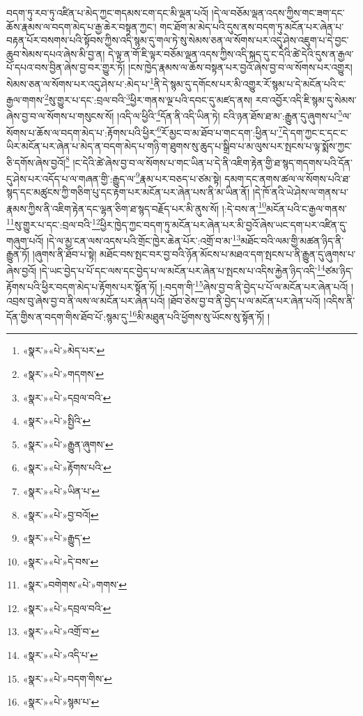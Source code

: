 བདག་ཏུ་རབ་ཏུ་འཛིན་པ་མེད་ཀྱང་གདམས་ངག་དང་མི་ལྡན་པའོ། །དེ་ལ་བཅོམ་ལྡན་འདས་ཀྱིས་གང་ཟག་དང་ཆོས་རྣམས་ལ་བདག་མེད་པ་རྒྱ་ཆེར་བསྟན་ཀྱང་། གང་ཐོག་མ་མེད་པའི་དུས་ནས་བདག་ཏུ་མངོན་པར་ཞེན་པ་བརྟན་པོར་བསགས་པའི་སྟོབས་ཀྱིས་འདི་སྙམ་དུ་གལ་ཏེ་སུ་སེམས་ཅན་ལ་སོགས་པར་འདུ་ཤེས་འཇུག་པ་དེ་བྱང་ཆུབ་སེམས་དཔའ་ཞེས་མི་བྱ་ན། དེ་ལྟ་ན་གོ་ཇི་ལྟར་བཅོམ་ལྡན་འདས་ཀྱིས་འདི་སྐད་དུ་ང་དེའི་ཚེ་དེའི་དུས་ན་རྒྱལ་པོ་དཔའ་བས་བྱིན་ཞེས་བྱ་བར་གྱུར་ཏོ། །ངས་ཁྱེད་རྣམས་ལ་ཆོས་བསྟན་པར་བྱའོ་ཞེས་བྱ་བ་ལ་སོགས་པར་འགྱུར། སེམས་ཅན་ལ་སོགས་པར་འདུ་ཤེས་པ་:མེད་པ་\footnote{«སྣར་»«པེ་»མེད་པར་}ནི་དེ་སྙམ་དུ་དགོངས་པར་མི་འགྱུར་རོ་སྙམ་པ་དེ་མངོན་པའི་ང་རྒྱལ་གགས་\footnote{«སྣར་»«པེ་»གདགས་}སུ་གྱུར་པ་དང་:བྲལ་བའི་\footnote{«སྣར་»«པེ་»དབྲལ་བའི་}ཕྱིར་གནས་ལྔ་པའི་དབང་དུ་མཛད་ནས། རབ་འབྱོར་འདི་ཇི་སྙམ་དུ་སེམས་ཞེས་བྱ་བ་ལ་སོགས་པ་གསུངས་སོ། །འདི་ལ་ཕྱིའི་\footnote{«སྣར་»«པེ་»སྤྱིའི་}དོན་ནི་འདི་ཡིན་ཏེ། ངའི་ཉན་ཐོས་ཐ་མ་:རྒྱུན་དུ་ཞུགས་པ་\footnote{«སྣར་»«པེ་»རྒྱུན་ཞུགས་}ལ་སོགས་པ་ཆོས་ལ་བདག་མེད་པ་:རྟོགས་པའི་ཕྱིར་\footnote{«སྣར་»«པེ་»རྟོགས་པའི་}རོ་མྱང་བ་མ་ཐོབ་པ་གང་དག་:ཕྱིན་པ་\footnote{«སྣར་»«པེ་»ཡིན་པ་}དེ་དག་ཀྱང་ང་དང་ང་ཡིར་མངོན་པར་ཞེན་པ་མེད་ན་བདག་མེད་པ་གཉི་ག་ཐུགས་སུ་ཆུད་པ་སྒྲིབ་པ་མ་ལུས་པར་སྤངས་པ་ལྟ་སྨོས་ཀྱང་ཅི་དགོས་ཞེས་བྱའོ།\footnote{«སྣར་»«པེ་»བྱ་བའོ།} །ང་དེའི་ཚེ་ཞེས་བྱ་བ་ལ་སོགས་པ་གང་ཡིན་པ་དེ་ནི་འཇིག་རྟེན་གྱི་ཐ་སྙད་གདགས་པའི་དོན་དུ་ཤེས་པར་འདོད་པ་ལ་གཞན་གྱི་:རྒྱུད་ལ་\footnote{«སྣར་»«པེ་»རྒྱུད་}རྣམ་པར་བཅད་པ་ཙམ་སྟེ། དམག་དང་ནགས་ཚལ་ལ་སོགས་པའི་ཐ་སྙད་དང་མཚུངས་ཀྱི་གཅིག་པུ་དང་རྟག་པར་མངོན་པར་ཞེན་པས་ནི་མ་ཡིན་ནོ། །དེ་ཁོ་ནའི་ཡེ་ཤེས་ལ་གནས་པ་རྣམས་ཀྱིས་ནི་འཇིག་རྟེན་དང་ལྷན་ཅིག་ཐ་སྙད་བརྗོད་པར་མི་ནུས་སོ། །:དེ་བས་ན་\footnote{«སྣར་»«པེ་»དེ་བས་}མངོན་པའི་ང་རྒྱལ་གནས་\footnote{«སྣར་»བགེགས་«པེ་»གགས་}སུ་གྱུར་པ་དང་:བྲལ་བའི་\footnote{«སྣར་»«པེ་»དབྲལ་བའི་}ཕྱིར་ཁྱེད་ཀྱང་བདག་ཏུ་མངོན་པར་ཞེན་པར་མི་བྱའོ་ཞེས་ཡང་དག་པར་འཛིན་དུ་གཞུག་པའོ། །དེ་ལ་མྱ་ངན་ལས་འདས་པའི་གྲོང་ཁྱེར་ཆེན་པོར་:འགྲོ་བ་མ་\footnote{«སྣར་»«པེ་»འགྲོ་བ་}མཐོང་བའི་ལམ་གྱི་མཚན་ཉིད་ནི་རྒྱུན་ཏོ། །ཞུགས་ནི་ཐོབ་པ་སྟེ། མཐོང་བས་སྤང་བར་བྱ་བའི་ཉོན་མོངས་པ་མཐའ་དག་སྤངས་པ་ནི་རྒྱུན་དུ་ཞུགས་པ་ཞེས་བྱའོ། །དེ་ཡང་བྱེད་པ་པོ་དང་ལས་དང་བྱེད་པ་ལ་མངོན་པར་ཞེན་པ་སྤངས་པ་འདིས་རྐྱེན་ཉིད་འདི་\footnote{«སྣར་»«པེ་»འདི་པ་}ཙམ་ཉིད་རྟོགས་པའི་ཕྱིར་བདག་མེད་པ་རྟོགས་པར་སྟོན་ཏོ། །:བདག་གི་\footnote{«སྣར་»«པེ་»བདག་གིས་}ཞེས་བྱ་བ་ནི་བྱེད་པ་པོ་ལ་མངོན་པར་ཞེན་པའོ། །འབྲས་བུ་ཞེས་བྱ་བ་ནི་ལས་ལ་མངོན་པར་ཞེན་པའོ། །ཐོབ་ཅེས་བྱ་བ་ནི་བྱེད་པ་ལ་མངོན་པར་ཞེན་པའོ། །འདིས་ནི་དོན་གྱིས་ན་བདག་གིས་ཐོབ་པོ་:སྙམ་དུ་\footnote{«སྣར་»«པེ་»སྙམ་པ་}མི་མཐུན་པའི་ཕྱོགས་སུ་ཡོངས་སུ་སྟོན་ཏོ། །
